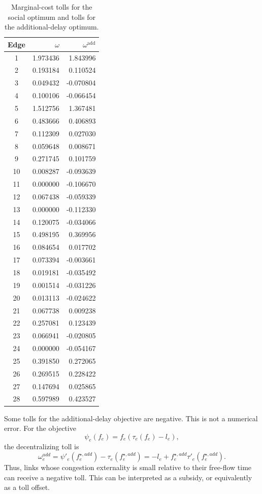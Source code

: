\documentclass[11pt,a4paper]{article}
\begin{document}
\begin{table}[h]
\centering
\scriptsize
\begin{tabular}{c|r|r}
\hline
Edge & \(\omega\) & \(\omega^{\mathrm{add}}\)\\
\hline
1 & 1.973436 & 1.843996\\
2 & 0.193184 & 0.110524\\
3 & 0.049432 & -0.070804\\
4 & 0.100106 & -0.066454\\
5 & 1.512756 & 1.367481\\
6 & 0.483666 & 0.406893\\
7 & 0.112309 & 0.027030\\
8 & 0.059648 & 0.008671\\
9 & 0.271745 & 0.101759\\
10 & 0.008287 & -0.093639\\
11 & 0.000000 & -0.106670\\
12 & 0.067438 & -0.059339\\
13 & 0.000000 & -0.112330\\
14 & 0.120075 & -0.034066\\
15 & 0.498195 & 0.369956\\
16 & 0.084654 & 0.017702\\
17 & 0.073394 & -0.003661\\
18 & 0.019181 & -0.035492\\
19 & 0.001514 & -0.031226\\
20 & 0.013113 & -0.024622\\
21 & 0.067738 & 0.009238\\
22 & 0.257081 & 0.123439\\
23 & 0.066941 & -0.020805\\
24 & 0.000000 & -0.054167\\
25 & 0.391850 & 0.272065\\
26 & 0.269515 & 0.228422\\
27 & 0.147694 & 0.025865\\
28 & 0.597989 & 0.423527\\
\hline
\end{tabular}
\caption{Marginal-cost tolls for the social optimum and tolls for the
additional-delay optimum.}
\label{tab:exercise3-tolls}
\end{table}




Some tolls for the additional-delay objective are negative. This is not a numerical
error. For the objective
\[
\psi_e(f_e)=f_e(\tau_e(f_e)-l_e),
\]
the decentralizing toll is
\[
\omega_e^{add}=\psi'_e(f_e^{\star,add})-\tau_e(f_e^{\star,add})
= -l_e + f_e^{\star,add}\tau'_e(f_e^{\star,add}).
\]
Thus, links whose congestion externality is small relative to their free-flow time
can receive a negative toll. This can be interpreted as a subsidy, or equivalently
as a toll offset.
\end{document}
